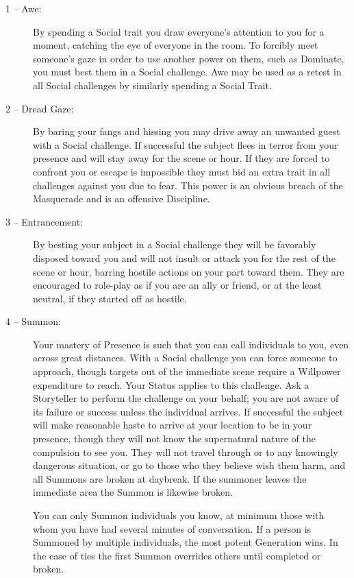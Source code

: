 \begin{description}
	\item[1 -- Awe:]  By spending a Social trait you draw everyone's attention to you for a moment, catching the 
	eye of everyone in the room.  To forcibly meet someone's gaze in order to use another power on them, such as 
	Dominate, you must best them in a Social challenge.  Awe may be used as a retest in all Social challenges by 
	similarly spending a Social Trait.
	\item[2 -- Dread Gaze:]  By baring your fangs and hissing you may drive away an unwanted guest with a Social 
	challenge.  If successful the subject flees in terror from your presence and will stay away for the scene or 
	hour.  If they are forced to confront you or escape is impossible they must bid an extra trait in all 
	challenges against you due to fear.  This power is an obvious breach of the Masquerade and is an offensive 
	Discipline.
	\item[3 -- Entrancement:]  By besting your subject in a Social challenge they will be favorably disposed 
	toward you and will not insult or attack you for the rest of the scene or hour, barring hostile actions on 
	your part toward them.  They are encouraged to role-play as if you are an ally or friend, or at the least 
	neutral, if they started off as hostile.
	\item[4 -- Summon:]  Your mastery of Presence is such that you can call individuals to you, even across great 
	distances.  With a Social challenge you can force someone to approach, though targets out of the 
	immediate scene require a Willpower expenditure to reach.  Your Status applies to this challenge.  Ask a 
	Storyteller to perform the challenge on your behalf; you are not aware of its failure or success unless the 
	individual arrives.  If successful the subject will make reasonable haste to arrive at your location to be in 
	your presence, though they will not know the supernatural nature of the compulsion to see you.  They will not 
	travel through or to any knowingly dangerous situation, or go to those who they believe wish them harm, and all 
	Summons are broken at daybreak.  If the summoner leaves the immediate area the Summon is likewise broken.
	
	You can only Summon individuals you know, at minimum those with whom you have had several minutes of 
	conversation.  If a person is Summoned by multiple individuals, the most potent Generation wins.  In the case of
	ties the first Summon overrides others until completed or broken.
	

\end{description}
